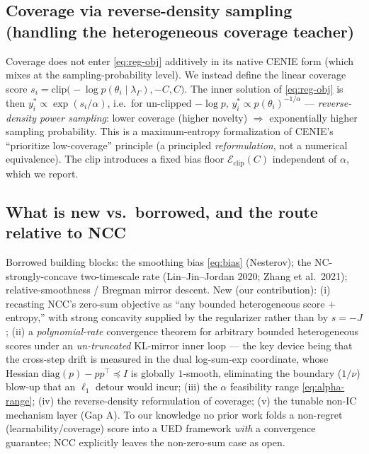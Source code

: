 \documentclass[11pt]{article}
\newcommand{\level}{\theta}        %
\newcommand{\dist}{y}              %
\newcommand{\score}{s}             %
\begin{document}
\subsection{Coverage via reverse-density sampling (handling the heterogeneous coverage teacher)}
\label{sec:coverage}
Coverage does not enter \eqref{eq:reg-obj} additively in its native CENIE form (which mixes at the sampling-probability level). We instead define the linear coverage score $\score_i=\mathrm{clip}\big(-\log p(\level_i\mid\lambda_\Gamma),-C,C\big)$. The inner solution of \eqref{eq:reg-obj} is then $\dist^{*}_i \propto \exp(\score_i/\alpha)$, i.e.\ for un-clipped $-\log p$, $\dist^{*}_i \propto p(\level_i)^{-1/\alpha}$ --- \emph{reverse-density power sampling}: lower coverage (higher novelty) $\Rightarrow$ exponentially higher sampling probability. This is a maximum-entropy formalization of CENIE's ``prioritize low-coverage'' principle (a principled \emph{reformulation}, not a numerical equivalence). The clip introduces a fixed bias floor $\mathcal{E}_{\mathrm{clip}}(C)$ independent of $\alpha$, which we report.

\subsection{What is new vs.\ borrowed, and the route relative to NCC}
\label{sec:proposal-vs-ncc}
Borrowed building blocks: the smoothing bias \eqref{eq:bias} (Nesterov); the NC-strongly-concave two-timescale rate (Lin--Jin--Jordan 2020; Zhang et al.\ 2021); relative-smoothness / Bregman mirror descent. New (our contribution): (i) recasting NCC's zero-sum objective as ``any bounded heterogeneous score $+$ entropy,'' with strong concavity supplied by the regularizer rather than by $\score=-J$; (ii) a \emph{polynomial-rate} convergence theorem for arbitrary bounded heterogeneous scores under an \emph{un-truncated} KL-mirror inner loop --- the key device being that the cross-step drift is measured in the dual log-sum-exp coordinate, whose Hessian $\mathrm{diag}(p)-pp^{\top}\preceq I$ is globally $1$-smooth, eliminating the boundary ($1/\nu$) blow-up that an $\ell_1$ detour would incur; (iii) the $\alpha$ feasibility range \eqref{eq:alpha-range}; (iv) the reverse-density reformulation of coverage; (v) the tunable non-IC mechanism layer (Gap A). To our knowledge no prior work folds a non-regret (learnability/coverage) score into a UED framework \emph{with} a convergence guarantee; NCC explicitly leaves the non-zero-sum case as open.
\end{document}
